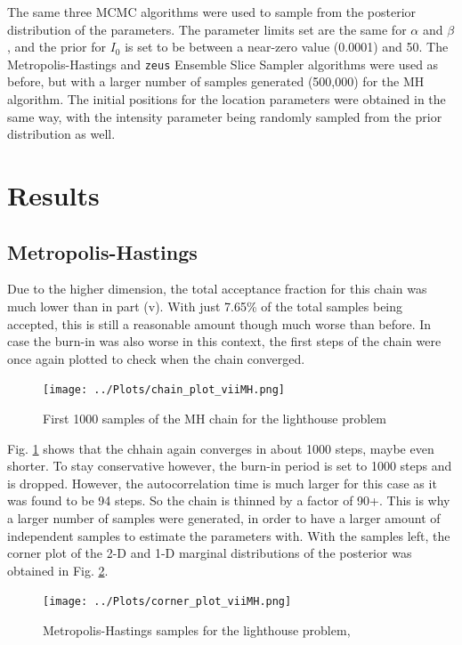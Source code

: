 \documentclass[12pt]{report} %
\begin{document}
The same three MCMC algorithms were used to sample from the posterior distribution of the parameters. The parameter limits set are the same for $\alpha$ and $\beta$, and the prior for $I_{0}$ is set to be between a near-zero value (0.0001) and 50. The Metropolis-Hastings and \texttt{zeus} Ensemble Slice Sampler algorithms were used as before, but with a larger number of samples generated (500,000) for the MH algorithm. The initial positions for the location parameters were obtained in the same way, with the intensity parameter being randomly sampled from the prior distribution as well.

\section{Results}

\subsection{Metropolis-Hastings}

Due to the higher dimension, the total acceptance fraction for this chain was much lower than in part (v). With just 7.65\% of the total samples being accepted, this is still a reasonable amount though much worse than before. In case the burn-in was also worse in this context, the first steps of the chain were once again plotted to check when the chain converged.

\begin{figure}[h]
\centering
\texttt{[image: ../Plots/chain\_plot\_viiMH.png]}
\caption{First 1000 samples of the MH chain for the lighthouse problem}
\label{fig:MH_convergence_vii}
\end{figure}

Fig. \ref{fig:MH_convergence_vii} shows that the chhain again converges in about 1000 steps, maybe even shorter. To stay conservative however, the burn-in period is set to 1000 steps and is dropped. However, the autocorrelation time is much larger for this case as it was found to be 94 steps. So the chain is thinned by a factor of 90+. This is why a larger number of samples were generated, in order to have a larger amount of independent samples to estimate the parameters with. With the samples left, the corner plot of the 2-D and 1-D marginal distributions of the posterior was obtained in Fig. \ref{fig:MH_samples_vii}.

\begin{figure}[h]
\centering
\texttt{[image: ../Plots/corner\_plot\_viiMH.png]}
\caption{Metropolis-Hastings samples for the lighthouse problem, }
\label{fig:MH_samples_vii}
\end{figure}
\end{document}
